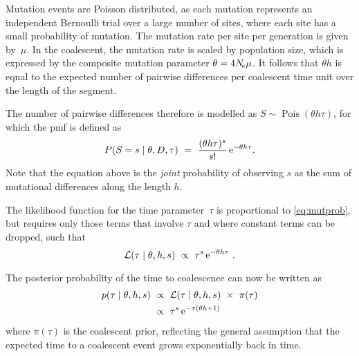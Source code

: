 Mutation events are Poisson distributed, as each mutation represents an independent Bernoulli trial over a large number of sites, where each site has a small probability of mutation.
The mutation rate per site per generation is given by~$\mu$.
In the coalescent, the mutation rate is scaled by population size, which is expressed by the composite mutation parameter ${\theta = 4N_{\!e}\mu}$.
It follows that ${\theta h}$ is equal to the expected number of pairwise differences per coalescent time unit over the length of the segment.

The number of pairwise differences therefore is modelled as ${S \sim \operatorname{Pois}(\theta h \tau)}$, for which the \gls{pmf} is defined as
\begin{equation}\label{eq:mutprob}
	P(S=s \mid \theta,D,\tau) ~=~ \frac{(\theta h \tau)^s}{s!} \,\mathrm{e}^{-\theta h \tau}\text{.}
\end{equation}
Note that the equation above is the \emph{joint} probability of observing $s$ as the sum of mutational differences along the length $h$.

The likelihood function for the time parameter~$\tau$ is proportional to \cref{eq:mutprob}, but requires only those terms that involve $\tau$ and where constant terms can be dropped, such that
\begin{equation}\label{eq:mut_like}
	\mathcal{L}(\tau \mid \theta,h,s) ~\propto~ \tau^s \,\mathrm{e}^{-\theta h \tau}\ .
\end{equation}

The posterior probability of the time to coalescence can now be written as
\begin{equation}\label{eq:mut_post}
\begin{split}
	p(\tau \mid \theta,h,s)
	&~\propto~ \mathcal{L}(\tau \mid \theta,h,s)~\times~\pi(\tau) \\
	&~\propto~ \tau^s \,\mathrm{e}^{- \tau (\theta h +1)}
\end{split}
\end{equation}
where $\pi(\tau)$ is the coalescent prior, reflecting the general assumption that the expected time to a coalescent event grows exponentially back in time.

